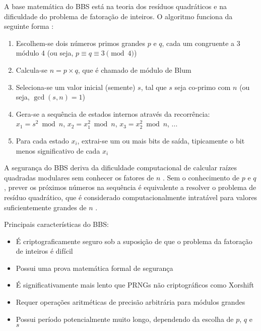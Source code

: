 A base matemática do BBS está na teoria dos resíduos quadráticos \cite{menezes1996handbook} e na dificuldade do problema de fatoração de inteiros. O algoritmo funciona da seguinte forma \cite{blum1986simple}:

\begin{enumerate}
    \item Escolhem-se dois números primos grandes $p$ e $q$, cada um congruente a 3 módulo 4 (ou seja, $p \equiv q \equiv 3 \pmod{4}$)
    \item Calcula-se $n = p \times q$, que é chamado de módulo de Blum
    \item Seleciona-se um valor inicial (semente) $s$, tal que $s$ seja co-primo com $n$ (ou seja, $\gcd(s,n) = 1$)
    \item Gera-se a sequência de estados internos através da recorrência: $x_1 = s^2 \bmod n$, $x_2 = x_1^2 \bmod n$, $x_3 = x_2^2 \bmod n$, ...
    \item Para cada estado $x_i$, extrai-se um ou mais bits de saída, tipicamente o bit menos significativo de cada $x_i$
\end{enumerate}

A segurança do BBS deriva da dificuldade computacional de calcular raízes quadradas modulares sem conhecer os fatores de $n$ \cite{sidorenko2005concrete}. Sem o conhecimento de $p$ e $q$, prever os próximos números na sequência é equivalente a resolver o problema de resíduo quadrático, que é considerado computacionalmente intratável para valores suficientemente grandes de $n$ \cite{koblitz2015riddle, blum1986simple}.

Principais características do BBS:
\begin{itemize}
    \item É criptograficamente seguro sob a suposição de que o problema da fatoração de inteiros é difícil \cite{sidorenko2005concrete}
    \item Possui uma prova matemática formal de segurança \cite{blum1986simple}
    \item É significativamente mais lento que PRNGs não criptográficos como Xorshift \cite{vassilev2016entropy}
    \item Requer operações aritméticas de precisão arbitrária para módulos grandes \cite{menezes1996handbook}
    \item Possui período potencialmente muito longo, dependendo da escolha de $p$, $q$ e $s$ \cite{menezes1996handbook}
\end{itemize}

